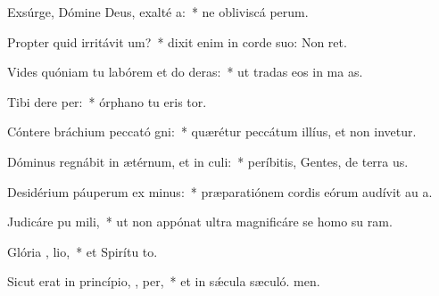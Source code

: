 \item Exsúrge, Dómine Deus, exalté  a:~* ne obliviscá perum.
\item Propter quid irritávit  um?~* dixit enim in corde suo: Non ret.
\item Vides quóniam tu labórem et do deras:~* ut tradas eos in ma as.
\item Tibi dere  per:~* órphano tu eris tor.
\item Cóntere bráchium peccató  gni:~* quærétur peccátum illíus, et non invetur.
\item Dóminus regnábit in ætérnum, et in  culi:~* períbitis, Gentes, de terra us.
\item Desidérium páuperum ex minus:~* præparatiónem cordis eórum audívit au a.
\item Judicáre pu  mili,~* ut non appónat ultra magnificáre se homo su ram.
\item Glória ,  lio,~* et Spirítu to.
\item Sicut erat in princípio,  ,  per,~* et in sǽcula sæculó. men.
